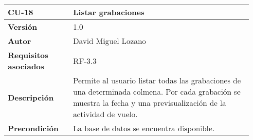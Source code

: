 \begin{longtable}[H]{@{}ll@{}}
\toprule
\begin{minipage}[b]{0.26\columnwidth}\raggedright\strut
\textbf{CU-18}\strut
\end{minipage} & \begin{minipage}[b]{0.68\columnwidth}\raggedright\strut
\textbf{Listar grabaciones}\strut
\end{minipage}\tabularnewline
\midrule
\endhead
\begin{minipage}[t]{0.26\columnwidth}\raggedright\strut
\textbf{Versión}\strut
\end{minipage} & \begin{minipage}[t]{0.68\columnwidth}\raggedright\strut
1.0\strut
\end{minipage}\tabularnewline
\begin{minipage}[t]{0.26\columnwidth}\raggedright\strut
\textbf{Autor}\strut
\end{minipage} & \begin{minipage}[t]{0.68\columnwidth}\raggedright\strut
David Miguel Lozano\strut
\end{minipage}\tabularnewline
\begin{minipage}[t]{0.26\columnwidth}\raggedright\strut
\textbf{Requisitos asociados}\strut
\end{minipage} & \begin{minipage}[t]{0.68\columnwidth}\raggedright\strut
RF-3.3\strut
\end{minipage}\tabularnewline
\begin{minipage}[t]{0.26\columnwidth}\raggedright\strut
\textbf{Descripción}\strut
\end{minipage} & \begin{minipage}[t]{0.68\columnwidth}\raggedright\strut
Permite al usuario listar todas las grabaciones de una determinada
colmena. Por cada grabación se muestra la fecha y una previsualización
de la actividad de vuelo.\strut
\end{minipage}\tabularnewline
\begin{minipage}[t]{0.26\columnwidth}\raggedright\strut
\textbf{Precondición}\strut
\end{minipage} & \begin{minipage}[t]{0.68\columnwidth}\raggedright\strut
La base de datos se encuentra disponible.


\end{minipage}
\end{longtable}
